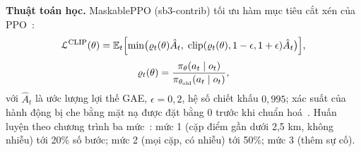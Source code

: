 \textbf{Thuật toán học.} MaskablePPO (sb3-contrib) tối ưu hàm mục tiêu cắt xén của PPO~\cite{schulman2017}:
\begin{equation}
\begin{gathered}
\mathcal{L}^{\text{CLIP}}(\theta) = \mathbb{E}_t\Bigl[\min\bigl(\varrho_t(\theta)\hat{A}_t,\;
\operatorname{clip}(\varrho_t(\theta),1-\epsilon,1+\epsilon)\hat{A}_t\bigr)\Bigr],\\[1mm]
\varrho_t(\theta)=\frac{\pi_\theta(a_t\mid o_t)}{\pi_{\theta_{\text{old}}}(a_t\mid o_t)},
\end{gathered}
\label{eq:ppo}
\end{equation}
với $\hat{A}_t$ là ước lượng lợi thế GAE, $\epsilon=0{,}2$, hệ số chiết khấu $0{,}995$; xác suất của hành động bị che bằng
mặt nạ được đặt bằng 0 trước khi chuẩn hoá~\cite{huang2022}. Huấn luyện theo chương trình ba mức~\cite{bengio2009}: mức 1
(cặp điểm gần dưới 2,5 km, không nhiễu) tới 20\% số bước; mức 2 (mọi cặp, có nhiễu) tới 50\%; mức 3 (thêm sự cố).

